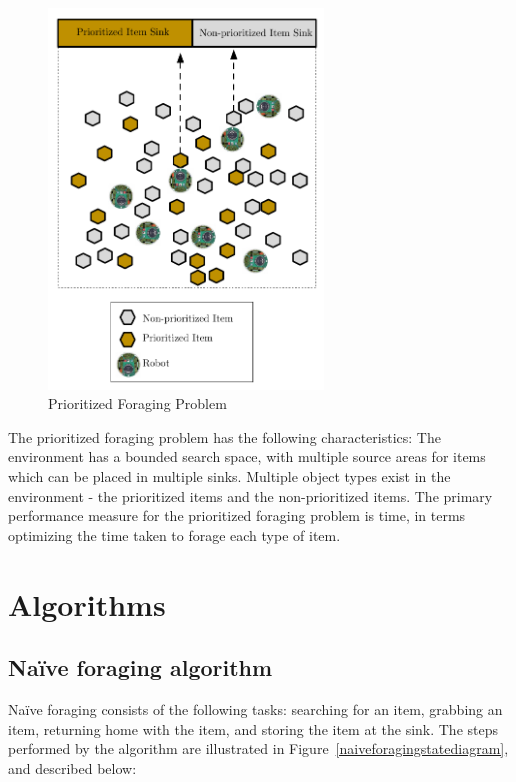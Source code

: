 \documentclass[preprint,12pt]{elsarticle}
\begin{document}
\begin{figure} [h]
	\centering
	\includegraphics[width=0.65\textwidth]{figures/EpuckGoldMining2.pdf}
	\caption{Prioritized Foraging Problem }
	\label{prioritizedforaging}
\end{figure}

The prioritized foraging problem has the following characteristics: The environment has a bounded search space, with multiple source areas for items which can be placed in multiple sinks. Multiple object types exist in the environment - the prioritized items and the non-prioritized items. The primary  performance measure for the prioritized foraging problem is time, in terms optimizing the time taken to forage each type of item. 


\section{Algorithms}
\label{algorithms}


\subsection{Na\"ive foraging algorithm}
\label{naiveforaging}

Na\"ive foraging consists of the following tasks: searching for an item, grabbing an item, returning home with the item, and storing the item at the sink. The steps performed by the algorithm are illustrated in Figure~\ref{naiveforagingstatediagram}, and described below:  
\end{document}
